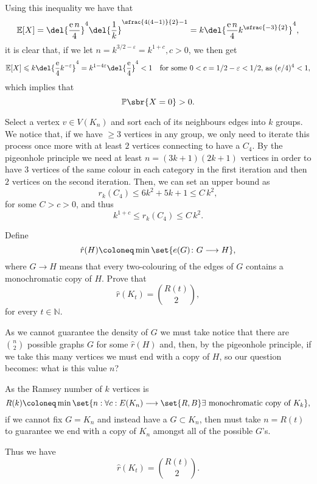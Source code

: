 \documentclass[english]{IMTexam}
\begin{document}
\begin{questions}
\begin{solution}
			Using this inequality we have that
			\[ \mathbb{E}[X]=\del{\dfrac{\mathrm{e}\,n}{4}}^{4}\del{\dfrac{1}{k}}^{\sfrac{4(4-1)}{2}-1}=k\del{\dfrac{\mathrm{e}\,n}{4}k^{\sfrac{-3}{2}}}^{4}, \]
			it is clear that, if we let $ n=k^{3/2-\varepsilon}=k^{1+c},c>0 $, we then get 
			\[ \mathbb{E}[X]\leqslant k\del{\dfrac{\mathrm{e}}{4}k^{-\varepsilon}}^{4}=k^{1-4\varepsilon}\del{\dfrac{\mathrm{e}}{4}}^{4}<1\quad\textup{for some }0<c=1/2-\varepsilon<1/2\text{, as }(e/4)^{4}<1, \]
			which implies that
			\[ \mathbb{P}\sbr{X=0}>0. \]
			
			Select a vertex $ v\in V(K_n) $ and sort each of its neighbours edges into $ k $ groups. We notice that, if we have $ \geqslant 3 $ vertices in any group, we only need to iterate this process once more with at least $ 2 $ vertices connecting to have a $ C_4 $.
			By the pigeonhole principle we need at least $ n=(3k+1)(2k+1) $ vertices in order to have $ 3 $ vertices of the same colour in each category in the first iteration and then $ 2 $ vertices on the second iteration. Then, we can set an upper bound as
			\[ r_k(C_4) \leqslant 6k^{2}+5k+1 \leqslant C\,k^{2}, \]
			for some $ C>c>0 $, and thus
			\[ k^{1+c}\leqslant r_k(C_4)\leqslant C\,k^{2}. \]
			
			\hfill\qedsymbol
		\end{solution}
		
		\question Define
		\[ \hat{r}(H)\coloneq\min\set{e(G)\colon G\longrightarrow H}, \]
		where $ G \longrightarrow H $ means that every two-colouring of the edges of $ G $ contains a monochromatic copy of $ H $. Prove that
		\[ \hat{r}(K_t)=\binom{R(t)}{2}, \]
		for every $ t\in\mathbb{N} $.
		
		\begin{solution}
			As we cannot guarantee the density of $ G $ we must take notice that there are $ \binom{n}{2} $ possible graphs $ G $ for some $ \hat{r}(H) $ and, then, by the pigeonhole principle, if we take this many vertices we must end with a copy of $ H $, so our question becomes: what is this value $ n $?
			
			As the Ramsey number of $ k $ vertices is
			\[ R(k)\coloneq\min\set{n:\forall c:E(K_n)\longrightarrow\set{R,B}\exists \textup{ monochromatic copy of }K_k}, \] if we cannot fix $ G=K_n $ and instead have a $ G\subset K_n $, then must take $ n=R(t) $ to guarantee we end with a copy of $ K_n $ amongst all of the possible $ G $'s.
			
			Thus we have
			\[ \hat{r}(K_t)=\binom{R(t)}{2}. \]
			
			\hfill\qedsymbol
		\end{solution}
		
	\end{questions}
\end{document}
